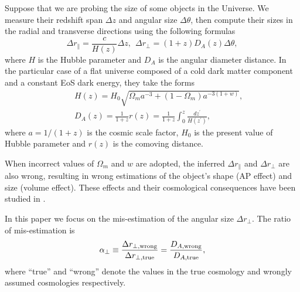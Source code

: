 \documentclass[iop]{emulateapj}
\begin{document}
Suppose that we are probing the size of some objects in the Universe.
We measure their redshift span $\Delta z$ and angular size $\Delta \theta$,
then compute their sizes in the radial and transverse directions using the following formulas
\begin{equation}\label{eq:distance}
\Delta r_{\parallel} = \frac{c}{H(z)}\Delta z,\ \ \Delta r_{\perp}=(1+z)D_A(z)\Delta \theta,
\end{equation}
where $H$ is the Hubble parameter and $D_A$ is the angular diameter distance.
In the particular case of a flat universe composed of a cold dark matter component and a constant EoS dark energy, they take the forms
\begin{eqnarray}\label{eq:HDA}
& &H(z) = H_0\sqrt{\Omega_ma^{-3}+(1-\Omega_m)a^{-3(1+w)}},\nonumber\\
& &D_A(z) = \frac{1}{1+z}r(z)=\frac{1}{1+z}\int_0^z \frac{dz^\prime}{H(z^\prime)},
\end{eqnarray}
where $a=1/(1+z)$ is the cosmic scale factor,
$H_0$ is the present value of Hubble parameter and $r(z)$ is the comoving distance.

When incorrect values of $\Omega_m$ and $w$ are adopted, 
the inferred $\Delta r_{\parallel}$ and $\Delta r_{\perp}$ are also wrong,
resulting in wrong estimations of the object's shape (AP effect) and size (volume effect).
These effects and their cosmological consequences have been studied in \cite{Li2014,Li2015,Li2016}.

In this paper we focus on the mis-estimation of the angular size $\Delta r_{\perp}$. %
The ratio of mis-estimation is
\begin{equation}\label{eq:DA}
 \alpha_{\perp} \equiv \frac{\Delta r_{\perp, \rm wrong}}{\Delta r_{\perp, \rm true}}
 = \frac{D_{A, \rm wrong}}{D_{A, \rm true}},
\end{equation}
where ``true'' and ``wrong'' denote the values in the true cosmology and wrongly assumed cosmologies respectively.
\end{document}
